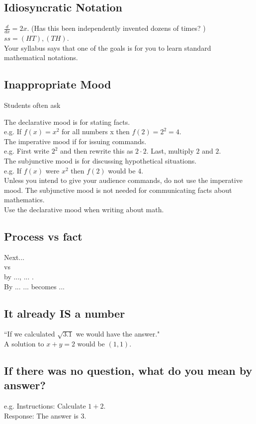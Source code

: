 \documentclass[12pt]{article}
\begin{document}
\subsection{Idiosyncratic Notation }
$\frac{d}{dx}= 2x.$ (Has this been independently invented dozens of times? )\\
$ss= (HT),(TH)$.\\
Your syllabus says that one of the goals is for you to learn standard mathematical notations. 

\subsection{Inappropriate Mood}
Students often ask 

The declarative mood is for stating facts.\\
e.g.  If $f(x)=x^2$ for all numbers x then $f(2)=2^2=4$. \\
The imperative mood if for issuing commands.\\
e.g.  First write $2^2$ and then rewrite this as $2\cdot 2$. Last, multiply $2$ and $2$.\\
The subjunctive mood is for discussing hypothetical situations.\\
e.g. If $f(x)$ were $x^2$ then $f(2)$ would be 4.\\[.2cm]

Unless you intend to give your audience commands, do not use the imperative mood. The subjunctive mood is not needed for communicating facts about mathematics. 
\\


Use the declarative mood when writing about math.


\subsection{Process vs fact}
Next...\\
vs\\
by ..., ... .\\
By ... ... becomes ...

\subsection{It already IS a number}
``If we calculated $\sqrt{3.1}$ we would have the answer."\\
A solution to $x+y=2$ would be $(1,1)$.

\subsection{If there was no question, what do you mean by answer?}
e.g. Instructions: Calculate $1+2$.\\
Response: The answer is 3.
\end{document}
